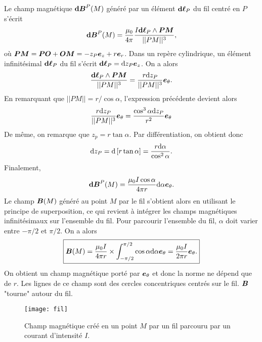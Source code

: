 \begin{exemple}
	Le champ magnétique $\mathrm{\textbf{d}}\vecb^P(M)$ généré par un élément
	$\dl_P$ du fil centré en $P$ s'écrit
	\begin{equation*}
	\mathrm{\textbf{d}}\vecb^P(M) = \dfrac{\mu_0}{4 \pi} 
	              \dfrac{I \dl_P \wedge \mitbf{PM}}{||PM||^3},
	\end{equation*}
	où $\mitbf{PM} = \mitbf{PO} + \mitbf{OM} = - z_P\ez + r\er$. Dans un repère
	cylindrique, un élément infinitésimal $\dl_P$ du fil s'écrit
	$\dl_P = \dz_P \ez$. On a alors
	\begin{equation*}
		\dfrac{\dl_P \wedge \mitbf{PM}}{||PM||^3} = 
		\dfrac{r\dz_P}{||PM||^3}\etheta. 	
	\end{equation*}
	En remarquant que $||PM|| = r/\cos\alpha$, l'expression précédente devient alors
	\begin{equation*}
		\dfrac{r\dz_P}{||PM||^3}\etheta = \dfrac{\cos^3\alpha \dz_P}
		{r^2} \etheta
	\end{equation*}
	De même, on remarque que $z_p = r \tan\alpha$.
	Par différentiation, on obtient donc
	\begin{equation*}
		\mathrm{d}z_P = \mathrm{d}\left[r\tan\alpha\right] = 
		\dfrac{r \mathrm{d}\alpha}{\cos^2\alpha}.
	\end{equation*}
	Finalement,
	\begin{equation*}
		\mathrm{\textbf{d}}\vecb^P(M) = \dfrac{\mu_0 I \cos\alpha}
		{4 \pi r} \mathrm{d}\alpha \etheta.
	\end{equation*}
	Le champ $\vecb(M)$ généré au point $M$ par le fil s'obtient alors
	en utilisant le principe de superposition, ce qui revient à intégrer les champs 
	magnétiques infinitésimaux sur l'ensemble du fil. Pour parcourir l'ensemble du
	fil, $\alpha$ doit varier entre $-\pi/2$ et $\pi/2$. On a alors
	\begin{equation*}
		\boxed{\vecb(M) = \dfrac{\mu_0 I}{4\pi r}
			\times \displaystyle{\int_{-\pi/2}^{\pi/2} 
			\cos\alpha\mathrm{d}\alpha \etheta} =
	\dfrac{\mu_0 I}{2\pi r}\etheta.}
	\end{equation*}
	On obtient un champ magnétique porté par $\etheta$ et donc la norme ne dépend
	que de $r$. Les lignes de ce champ sont des cercles concentriques centrés
	sur le fil. $\vecb$ "tourne" autour du fil.
\end{exemple}
\begin{figure}[h!]
	\centering
	\texttt{[image: fil]}
	\caption{Champ magnétique créé en un point $M$ par un fil parcouru par
	un courant d'intensité $I$.}%
	\label{fig:magneto_spire}
\end{figure}

